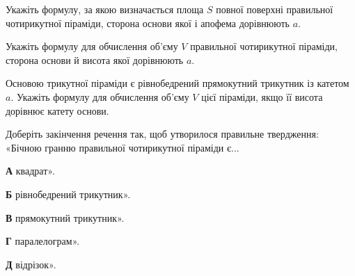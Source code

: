 \documentclass[12pt]{article}
\begin{document}
\begin{samepage}
\noindent\zadnum Укажіть формулу, за якою визначається площа $S$ повної поверхні правильної чотирикутної піраміди, сторона основи якої і апофема дорівнюють $a$. 

\nmtnobreak
\nopagebreak\nbvspace{0.3cm}
\par{}
\end{samepage}

\begin{samepage}
\noindent\zadnum Укажіть формулу для обчислення об’єму $V$ правильної чотирикутної піраміди, сторона основи й висота якої дорівнюють $a$. 

\nmtnobreak
\nopagebreak\nbvspace{0.3cm}
\par{}
\end{samepage}

\begin{samepage}
\noindent\zadnum Основою трикутної піраміди є рівнобедрений прямокутний трикутник із катетом $a$. Укажіть формулу для обчислення об’єму $V$ цієї піраміди, якщо її висота дорівнює катету основи. 

\nmtnobreak
\nopagebreak\nbvspace{0.3cm}
\par{}
\end{samepage}

\begin{samepage}
\noindent\zadnum Доберіть закінчення речення так, щоб утворилося правильне твердження: «Бічною гранню правильної чотирикутної піраміди є... 

\nmtnobreak
\nopagebreak\nbvspace{0.3cm}
\noindent
\textbf{А} \quad квадрат».

\nmtnobreak
\noindent
\textbf{Б} \quad рівнобедрений трикутник».

\nmtnobreak
\noindent
\textbf{В} \quad прямокутний трикутник».

\nmtnobreak
\noindent
\textbf{Г} \quad паралелограм».

\nmtnobreak
\noindent
\textbf{Д} \quad відрізок».

\nmtnobreak
\nopagebreak\nbvspace{0.5cm}
\par{}\vspace{0.25cm}
\end{samepage}
\end{document}
